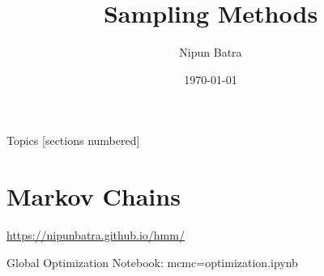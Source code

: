 \documentclass{beamer}
\begin{document}
\title{Sampling Methods}
\author{Nipun Batra}
\date{\today}
\maketitle

\begin{frame}{Topics}
    [sections numbered]
    \tableofcontents

\end{frame}

\section{Markov Chains}
\begin{frame}
    \url{https://nipunbatra.github.io/hmm/}
\end{frame}

\begin{frame}{Global Optimization}
    Notebook: mcmc=optimization.ipynb
    
\end{frame}
\end{document}
